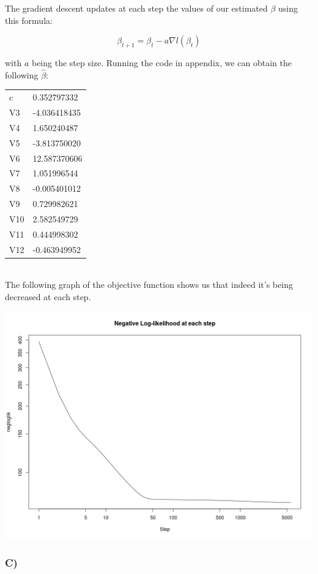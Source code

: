 \documentclass{article}
\begin{document}
The gradient descent updates at each step the values of our estimated $\beta$ using this formula:

\begin{equation*}
\beta_{t+1}=\beta_t-a\nabla l(\beta_t)
\end{equation*}

with $a$ being the step size. Running the code in appendix, we can obtain the following $\hat{\beta}$:\\

\begin{tabular}{ll}
c   & 0.352797332\\
V3  &-4.036418435\\
V4  & 1.650240487\\
V5  &-3.813750020\\
V6  &12.587370606\\
V7  & 1.051996544\\
V8  &-0.005401012\\
V9  & 0.729982621\\
V10 & 2.582549729\\
V11 & 0.444998302\\
V12 &-0.463949952
\end{tabular}\\

The following graph of the objective function shows us that indeed it's being decreased at each step.

\includegraphics[width=\textwidth]{Rplot_gradient.png}

\subsubsection*{C)}
\end{document}
